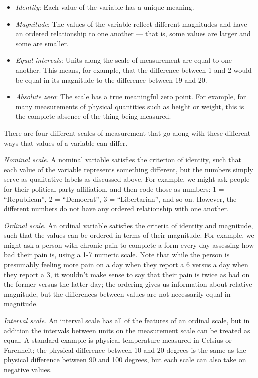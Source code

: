 \documentclass[]{book}
\providecommand{\tightlist}{%
  \setlength{\itemsep}{0pt}\setlength{\parskip}{0pt}}
\theoremstyle{definition}
\theoremstyle{definition}
\theoremstyle{definition}
\theoremstyle{remark}
\begin{document}
\begin{itemize}
\tightlist
\item
  \emph{Identity}: Each value of the variable has a unique meaning.\\
\item
  \emph{Magnitude}: The values of the variable reflect different
  magnitudes and have an ordered relationship to one another --- that
  is, some values are larger and some are smaller.
\item
  \emph{Equal intervals}: Units along the scale of measurement are equal
  to one another. This means, for example, that the difference between 1
  and 2 would be equal in its magnitude to the difference between 19 and
  20.
\item
  \emph{Absolute zero}: The scale has a true meaningful zero point. For
  example, for many measurements of physical quantities such as height
  or weight, this is the complete absence of the thing being measured.
\end{itemize}

There are four different scales of measurement that go along with these
different ways that values of a variable can differ.

\emph{Nominal scale}. A nominal variable satisfies the criterion of
identity, such that each value of the variable represents something
different, but the numbers simply serve as qualitative labels as
discussed above. For example, we might ask people for their political
party affiliation, and then code those as numbers: 1 = ``Republican'', 2
= ``Democrat'', 3 = ``Libertarian'', and so on. However, the different
numbers do not have any ordered relationship with one another.

\emph{Ordinal scale}. An ordinal variable satisfies the criteria of
identity and magnitude, such that the values can be ordered in terms of
their magnitude. For example, we might ask a person with chronic pain to
complete a form every day assessing how bad their pain is, using a 1-7
numeric scale. Note that while the person is presumably feeling more
pain on a day when they report a 6 versus a day when they report a 3, it
wouldn't make sense to say that their pain is twice as bad on the former
versus the latter day; the ordering gives us information about relative
magnitude, but the differences between values are not necessarily equal
in magnitude.

\emph{Interval scale}. An interval scale has all of the features of an
ordinal scale, but in addition the intervals between units on the
measurement scale can be treated as equal. A standard example is
physical temperature measured in Celsius or Farenheit; the physical
difference between 10 and 20 degrees is the same as the physical
difference between 90 and 100 degrees, but each scale can also take on
negative values.
\end{document}
